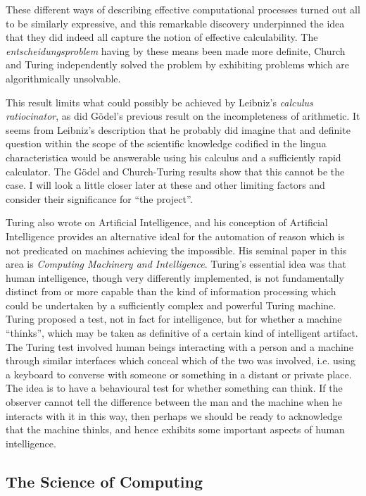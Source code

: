 These different ways of describing effective computational processes turned out all to be similarly expressive, and this remarkable discovery underpinned the idea that they did indeed all capture the notion of effective calculability.
The \emph{entscheidungsproblem} having by these means been made more definite, Church and Turing independently solved the problem by exhibiting problems which are algorithmically unsolvable.

This result limits what could possibly be achieved by Leibniz's \emph{calculus ratiocinator}, as did G\"odel's previous result on the incompleteness of arithmetic.
It seems from Leibniz's description that he probably did imagine that and definite question within the scope of the scientific knowledge codified in the lingua characteristica would be answerable using his calculus and a sufficiently rapid calculator.
The G\"odel and Church-Turing results show that this cannot be the case.
I will look a little closer later at these and other limiting factors and consider their significance for ``the project''.

Turing also wrote on Artificial Intelligence, and his conception of Artificial Intelligence provides an alternative ideal for the automation of reason which is not predicated on machines achieving the impossible.
His seminal paper in this area is \emph{Computing Machinery and Intelligence}\cite{turingCMI}.
Turing's essential idea was that human intelligence, though very differently implemented, is not fundamentally distinct from or more capable than the kind of information processing which could be undertaken by a sufficiently complex and powerful Turing machine.
Turing proposed a test, not in fact for intelligence, but for whether a machine ``thinks'', which may be taken as definitive of a certain kind of intelligent artifact.
The Turing test involved human beings interacting with a person and a machine through similar interfaces which conceal which of the two was involved, i.e. using a keyboard to converse with someone or something in a distant or private place.
The idea is to have a behavioural test for whether something can think.
If the observer cannot tell the difference between the man and the machine when he interacts with it in this way, then perhaps we should be ready to acknowledge that the machine thinks, and hence exhibits some important aspects of human intelligence.

\subsection{The Science of Computing}

